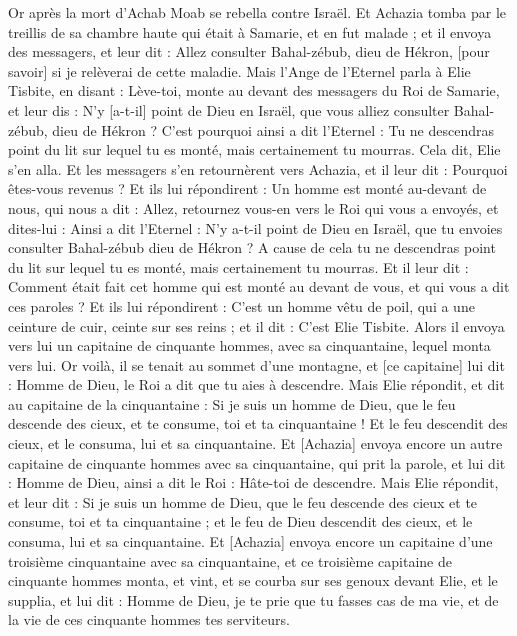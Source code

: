\BFont
\begin{multicols}{2}
\VerseOne{}Or après la mort d'Achab Moab se rebella contre Israël.
Et Achazia tomba par le treillis de sa chambre haute qui était à Samarie, et en fut malade ; et il envoya des messagers, et leur dit : Allez consulter Bahal-zébub, dieu de Hékron, [pour savoir] si je relèverai de cette maladie.
Mais l'Ange de l'Eternel parla à Elie Tisbite, en disant : Lève-toi, monte au devant des messagers du Roi de Samarie, et leur dis : N'y [a-t-il] point de Dieu en Israël, que vous alliez consulter Bahal-zébub, dieu de Hékron ?
C'est pourquoi ainsi a dit l'Eternel : Tu ne descendras point du lit sur lequel tu es monté, mais certainement tu mourras. Cela dit, Elie s'en alla.
Et les messagers s'en retournèrent vers Achazia, et il leur dit : Pourquoi êtes-vous revenus ?
Et ils lui répondirent : Un homme est monté au-devant de nous, qui nous a dit : Allez, retournez vous-en vers le Roi qui vous a envoyés, et dites-lui : Ainsi a dit l'Eternel : N'y a-t-il point de Dieu en Israël, que tu envoies consulter Bahal-zébub dieu de Hékron ? A cause de cela tu ne descendras point du lit sur lequel tu es monté, mais certainement tu mourras.
Et il leur dit : Comment était fait cet homme qui est monté au devant de vous, et qui vous a dit ces paroles ?
Et ils lui répondirent : C'est un homme vêtu de poil, qui a une ceinture de cuir, ceinte sur ses reins ; et il dit : C'est Elie Tisbite.
Alors il envoya vers lui un capitaine de cinquante hommes, avec sa cinquantaine, lequel monta vers lui. Or voilà, il se tenait au sommet d'une montagne, et [ce capitaine] lui dit : Homme de Dieu, le Roi a dit que tu aies à descendre.
Mais Elie répondit, et dit au capitaine de la cinquantaine : Si je suis un homme de Dieu, que le feu descende des cieux, et te consume, toi et ta cinquantaine ! Et le feu descendit des cieux, et le consuma, lui et sa cinquantaine.
Et [Achazia] envoya encore un autre capitaine de cinquante hommes avec sa cinquantaine, qui prit la parole, et lui dit : Homme de Dieu, ainsi a dit le Roi : Hâte-toi de descendre.
Mais Elie répondit, et leur dit : Si je suis un homme de Dieu, que le feu descende des cieux et te consume, toi et ta cinquantaine ; et le feu de Dieu descendit des cieux, et le consuma, lui et sa cinquantaine.
Et [Achazia] envoya encore un capitaine d'une troisième cinquantaine avec sa cinquantaine, et ce troisième capitaine de cinquante hommes monta, et vint, et se courba sur ses genoux devant Elie, et le supplia, et lui dit : Homme de Dieu, je te prie que tu fasses cas de ma vie, et de la vie de ces cinquante hommes tes serviteurs.

\end{multicols}

